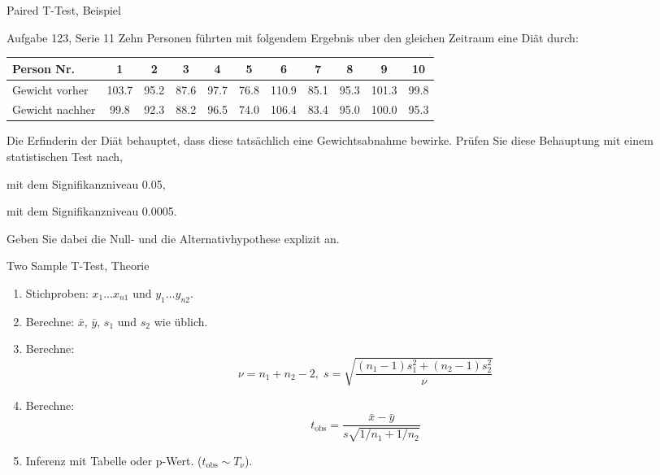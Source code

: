 \documentclass[handout]{beamer}
\begin{document}
\begin{frame}{Paired T-Test, Beispiel}
\begin{beamerboxesrounded}[shadow]{Aufgabe 123, Serie 11}
Zehn Personen führten mit folgendem Ergebnis uber den gleichen Zeitraum eine
Diät durch:

\vspace{2mm}\begin{center}{\tiny\begin{tabular}{l|cccccccccc}
Person Nr.&1&2&3&4&5&6&7&8&9&10\\\hline
Gewicht vorher&
103.7&95.2&87.6&97.7&76.8&110.9&85.1&95.3&101.3&99.8\\
Gewicht nachher&
99.8&92.3&88.2&96.5&74.0&106.4&83.4&95.0&100.0&95.3\\
\end{tabular}}\end{center}\vspace{2mm}

Die Erfinderin der Diät behauptet, dass diese tatsächlich eine Gewichtsabnahme
bewirke.  Prüfen Sie diese Behauptung mit einem statistischen Test nach, 
\begin{outline}
\item mit dem Signifikanzniveau 0.05, 
\item mit dem Signifikanzniveau 0.0005. 
\end{outline}

Geben Sie dabei die Null- und die Alternativhypothese explizit an.
\end{beamerboxesrounded}
\end{frame}

\begin{frame}{Two Sample T-Test, Theorie}
\begin{enumerate}
\item Stichproben: $x_1\ldots x_{n1}$ und $y_1\ldots y_{n2}$.
\item Berechne: $\bar{x}$, $\bar{y}$, $s_1$ und $s_2$ wie üblich.
\item Berechne: 
$$
\nu=n_1+n_2-2,\;
s=\sqrt{\frac{(n_1-1)s_1^2+(n_2-1)s_2^2}{\nu}}
$$

\item Berechne:
$$
t_\text{obs}=\frac{\bar{x}-\bar{y}}{s\sqrt{1/n_1+1/n_2}}
$$
\item Inferenz mit Tabelle oder p-Wert. ($t_\text{obs}\sim T_\nu$).
\end{enumerate}
\end{frame}
\end{document}
